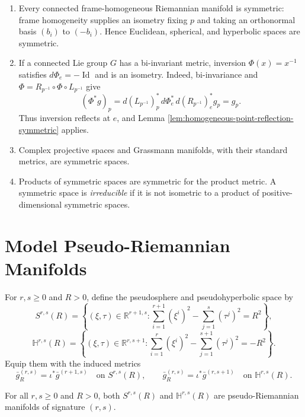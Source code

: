 \begin{example}
\label{ex:riemannian-symmetric-spaces}
\begin{enumerate}[label=(\alph*)]
\item Every connected frame-homogeneous Riemannian manifold is symmetric:
frame homogeneity supplies an isometry fixing $p$ and taking an orthonormal
basis $(b_i)$ to $(-b_i)$. Hence Euclidean, spherical, and hyperbolic spaces are
symmetric.

\item If a connected Lie group $G$ has a bi-invariant metric, inversion
$\Phi(x)=x^{-1}$ satisfies $d\Phi_e=-\operatorname{Id}$ and is an isometry.
Indeed, bi-invariance and
$\Phi=R_{p^{-1}}\circ\Phi\circ L_{p^{-1}}$ give
\[
(\Phi^*g)_p
=d(L_{p^{-1}})_p^*\,d\Phi_e^*\,d(R_{p^{-1}})_e^*g_p=g_p.
\]
Thus inversion reflects at $e$, and Lemma
\ref{lem:homogeneous-point-reflection-symmetric} applies.

\item Complex projective spaces and Grassmann manifolds, with their standard
metrics, are symmetric spaces.

\item Products of symmetric spaces are symmetric for the product metric. A
symmetric space is \emph{irreducible} if it is not isometric to a product of
positive-dimensional symmetric spaces.
\end{enumerate}
\end{example}
\section{Model Pseudo-Riemannian Manifolds}

For $r,s\geq0$ and $R>0$, define the pseudosphere and pseudohyperbolic space by
\[
S^{r,s}(R)=\left\{(\xi,\tau)\in\mathbb R^{r+1,s}:
\sum_{i=1}^{r+1}(\xi^i)^2-\sum_{j=1}^{s}(\tau^j)^2=R^2\right\},
\]
\[
\mathbb H^{r,s}(R)=\left\{(\xi,\tau)\in\mathbb R^{r,s+1}:
\sum_{i=1}^{r}(\xi^i)^2-\sum_{j=1}^{s+1}(\tau^j)^2=-R^2\right\}.
\]
Equip them with the induced metrics
\[
\bar g_R^{(r,s)}=\iota^*\bar g^{(r+1,s)}
\quad\text{on }S^{r,s}(R),
\qquad
\bar g_R^{(r,s)}=\iota^*\bar g^{(r,s+1)}
\quad\text{on }\mathbb H^{r,s}(R).
\]

\begin{theorem}
\label{thm:pseudo-riemannian-signature}
For all $r,s\geq0$ and $R>0$, both $S^{r,s}(R)$ and
$\mathbb H^{r,s}(R)$ are pseudo-Riemannian manifolds of signature $(r,s)$.
\end{theorem}

